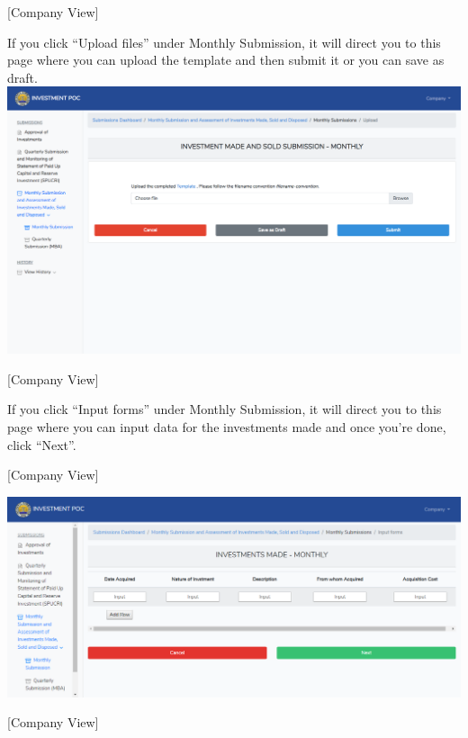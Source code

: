 \documentclass{article}
\begin{document}
[Company View]%

If you click “Upload files” under Monthly
Submission, it will direct you to this page where you can upload the
template and then submit it or you can save as draft.\includegraphics[keepaspectratio=true]{up-ic-screens/image216}{}%

[Company View]%

If you click “Input forms” under Monthly
Submission, it will direct you to this page where you can input data for
the investments made and once you’re done, click “Next”.%

[Company View]%

\includegraphics[keepaspectratio=true]{up-ic-screens/image119}{}%

[Company View]%
\end{document}

